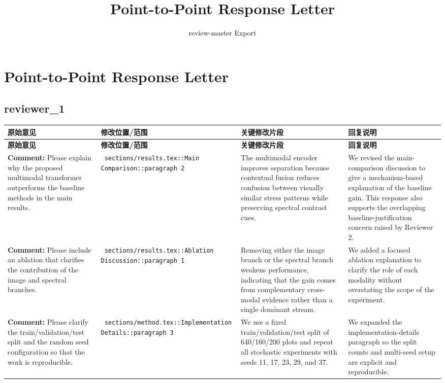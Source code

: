 \documentclass[11pt]{article}
\title{Point-to-Point Response Letter}
\author{review-master Export}
\date{}
\begin{document}
\maketitle

\section*{Point-to-Point Response Letter}

\subsection*{ reviewer\_1 }
\begin{longtable}{|p{}|p{}|p{}|p{}|}
\hline
\textbf{原始意见} & \textbf{修改位置/范围} & \textbf{关键修改片段} & \textbf{回复说明} \\
\hline
\endfirsthead
\hline
\textbf{原始意见} & \textbf{修改位置/范围} & \textbf{关键修改片段} & \textbf{回复说明} \\
\hline
\endhead
\textbf{Comment:} Please explain why the proposed multimodal transformer outperforms the baseline methods in the main results. & \texttt{ sections/results.tex::Main Comparison::paragraph 2 } & {\color{blue}\ttfamily The multimodal encoder improves separation because contextual fusion reduces confusion between visually similar stress patterns while preserving spectral contrast cues.} & We revised the main-comparison discussion to give a mechanism-based explanation of the baseline gain. This response also supports the overlapping baseline-justification concern raised by Reviewer 2. \\
\hline
\textbf{Comment:} Please include an ablation that clarifies the contribution of the image and spectral branches. & \texttt{ sections/results.tex::Ablation Discussion::paragraph 1 } & {\color{blue}\ttfamily Removing either the image branch or the spectral branch weakens performance, indicating that the gain comes from complementary cross-modal evidence rather than a single dominant stream.} & We added a focused ablation explanation to clarify the role of each modality without overstating the scope of the experiment. \\
\hline
\textbf{Comment:} Please clarify the train/validation/test split and the random seed configuration so that the work is reproducible. & \texttt{ sections/method.tex::Implementation Details::paragraph 3 } & {\color{blue}\ttfamily We use a fixed train/validation/test split of 640/160/200 plots and repeat all stochastic experiments with seeds 11, 17, 23, 29, and 37.} & We expanded the implementation-details paragraph so the split counts and multi-seed setup are explicit and reproducible. \\
\hline
\end{longtable}
\end{document}
